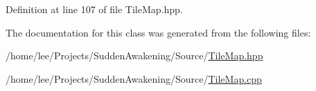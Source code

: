 Definition at line 107 of file Tile\-Map.\-hpp.



The documentation for this class was generated from the following files\-:\begin{DoxyCompactItemize}
\item 
/home/lee/\-Projects/\-Sudden\-Awakening/\-Source/\hyperlink{_tile_map_8hpp}{Tile\-Map.\-hpp}\item 
/home/lee/\-Projects/\-Sudden\-Awakening/\-Source/\hyperlink{_tile_map_8cpp}{Tile\-Map.\-cpp}\end{DoxyCompactItemize}
